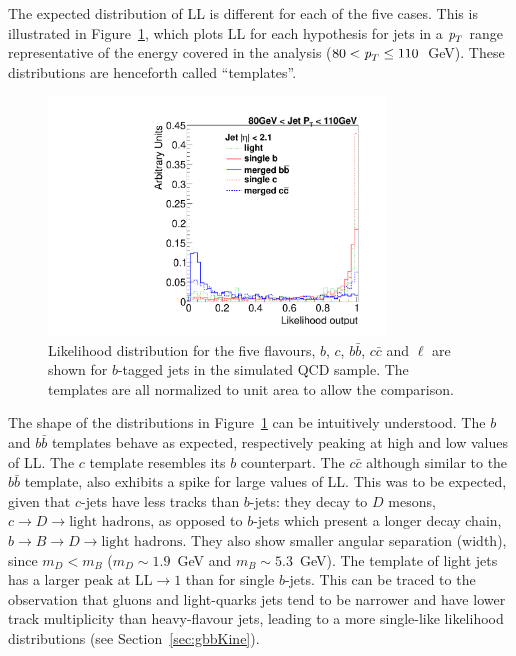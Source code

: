 The expected distribution of LL is different for each of the five cases. This is illustrated in Figure~\ref{fig:templates}, which plots LL for each hypothesis for jets in a ${\emph{p}_{T}}$ range representative of the energy covered in the analysis ($80<{\emph{p}_{T}}\leq110$~GeV). These distributions are henceforth called ``templates''. 
\begin{figure}[htb]
\centering
\includegraphics[width=0.80\textwidth]{FIGS/Fits/AllTemplates080.pdf}
\caption{Likelihood distribution for the five flavours, $b$, $c$, $b\bar{b}$, $c\bar{c}$ and $\ell$ are shown for $b$-tagged jets in the simulated QCD sample. The templates are all normalized to unit area to allow the comparison.}
\label{fig:templates}
\end{figure}
The shape of the distributions in Figure~\ref{fig:templates} can be intuitively understood. The $b$ and $b\bar{b}$ templates behave as expected, respectively peaking at high and low values of LL. The $c$ template resembles its $b$ counterpart. The $c\bar{c}$ although similar to the $b\bar{b}$ template, also exhibits a spike for large values of LL.  
This was to be expected, given that $c$-jets have less tracks than $b$-jets: they decay to $D$ mesons, $c \rightarrow D \rightarrow \mbox{light hadrons}$, as opposed to $b$-jets which present a longer decay chain, $b \rightarrow B \rightarrow D\rightarrow \mbox{light hadrons}$. They also show smaller angular separation (width), since $m_D < m_B$  ($m_D\sim 1.9$~GeV and $m_B \sim 5.3$~GeV).  
The template of light jets  %
has a larger peak at LL$\rightarrow 1$ than for single $b$-jets.
This can be traced to the observation that gluons and light-quarks jets tend to be narrower and have lower track multiplicity than heavy-flavour jets, leading to a more single-like likelihood distributions (see Section~\ref{sec:gbbKine}).


